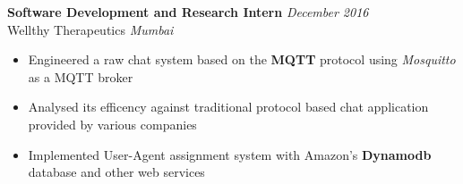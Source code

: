\documentclass{article}
\begin{document}
\textbf{Software Development and Research Intern} \hfill{\sl \small December 2016}
  \vspace{1pt}\\
  { {Wellthy Therapeutics} }\hfill{\sl \small Mumbai}\\
  \vspace{-17pt}
  \begin{itemize}[itemsep = -0.75 mm, leftmargin=*]
      \item Engineered a raw chat system based on the \textbf{MQTT} protocol using \emph{Mosquitto} as a MQTT broker
      \item Analysed its efficency against traditional protocol based chat application provided by various companies 
      \item Implemented User-Agent assignment system with Amazon's \textbf{Dynamodb} database and other web services
  \end{itemize}
\end{document}
